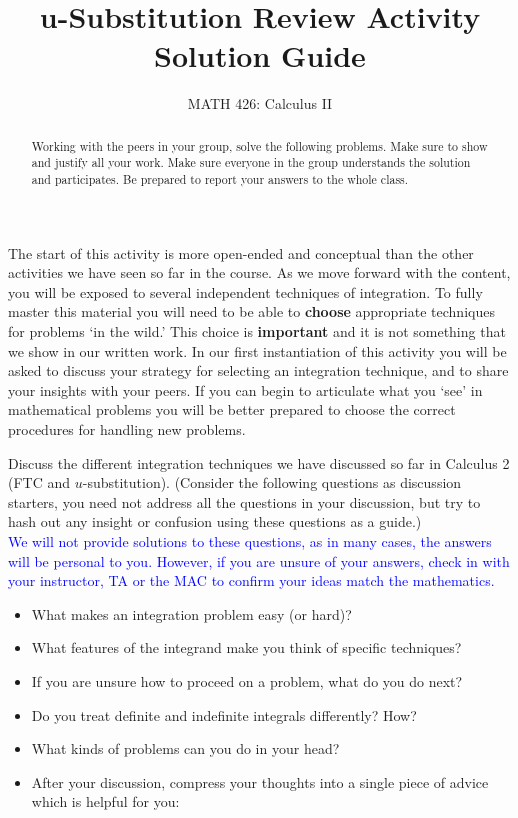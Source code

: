 \documentclass{ximera}
\title{u-Substitution Review Activity Solution Guide}
\author{MATH 426: Calculus II}
\begin{document}
\begin{abstract}
   Working with the peers in your group, solve the following problems. Make sure to show and justify all your work. Make sure everyone in the group understands the solution and participates. Be prepared to report your answers to the whole class. 
\end{abstract}
\maketitle

The start of this activity is more open-ended and conceptual than the other activities we have seen so far in the course. As we move forward with the content, you will be exposed to several independent techniques of integration. To fully master this material you will need to be able to \textbf{choose} appropriate techniques for problems `in the wild.' This choice is \textbf{important} and it is not something that we show in our written work. In our first instantiation of this activity you will be asked to discuss your strategy for selecting an integration technique, and to share your insights with your peers. If you can begin to articulate what you `see' in mathematical problems you will be better prepared to choose the correct procedures for handling new problems.\\

\begin{exercise}
    Discuss the different integration techniques we have discussed so far in Calculus 2 (FTC and $u$-substitution). (Consider the following questions as discussion starters, you need not address all the questions in your discussion, but try to hash out any insight or confusion using these questions as a guide.)\\
    \textcolor{blue}{We will not provide solutions to these questions, as in many cases, the answers will be personal to you.  However, if you are unsure of your answers, check in with your instructor, TA or the MAC to confirm your ideas match the mathematics.}

    \begin{itemize}
        \item What makes an integration problem easy (or hard)?

        \item What features of the integrand make you think of specific techniques?

        \item If you are unsure how to proceed on a problem, what do you do next?

        \item Do you treat definite and indefinite integrals differently? How?

        \item What kinds of problems can you do in your head?
        
        \item After your discussion, compress your thoughts into a single piece of advice which is helpful for you:
    \end{itemize}
\end{exercise}
\end{document}
